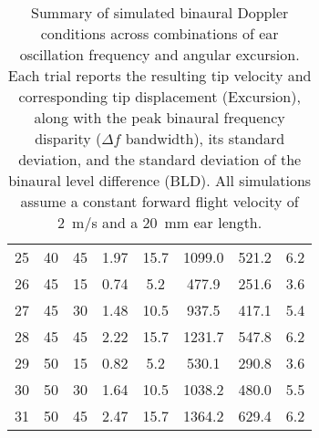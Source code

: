 \begin{table}[t]
\begin{tabularx}{\linewidth}{c c c c c c c c}
25 & 40 & 45 & 1.97 & 15.7 & 1099.0 & 521.2 & 6.2 \\
26 & 45 & 15 & 0.74 & 5.2 & 477.9 & 251.6 & 3.6 \\
27 & 45 & 30 & 1.48 & 10.5 & 937.5 & 417.1 & 5.4 \\
28 & 45 & 45 & 2.22 & 15.7 & 1231.7 & 547.8 & 6.2 \\
29 & 50 & 15 & 0.82 & 5.2 & 530.1 & 290.8 & 3.6 \\
30 & 50 & 30 & 1.64 & 10.5 & 1038.2 & 480.0 & 5.5 \\
31 & 50 & 45 & 2.47 & 15.7 & 1364.2 & 629.4 & 6.2 \\
\bottomrule
\end{tabularx}
\caption{Summary of simulated binaural Doppler conditions across combinations of ear oscillation frequency and angular excursion. Each trial reports the resulting tip velocity and corresponding tip displacement (Excursion), along with the peak binaural frequency disparity ($\Delta f$ bandwidth), its standard deviation, and the standard deviation of the binaural level difference (BLD). All simulations assume a constant forward flight velocity of 2~m/s and a 20~mm ear length.}
\label{tab:binaural_summary}
\end{table}
